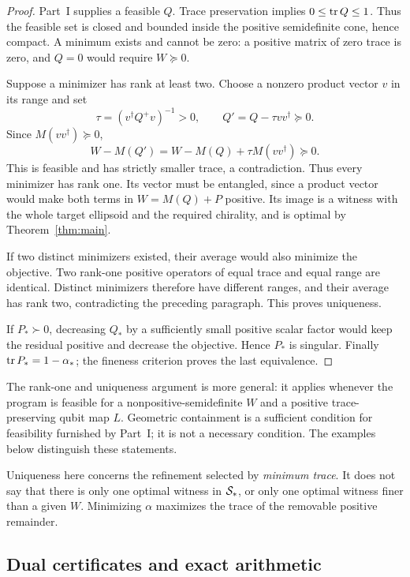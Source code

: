 \begin{proof}
Part~I supplies a feasible $Q$. Trace preservation implies $0\leq\operatorname{tr} Q\leq1$. Thus the feasible set is closed and bounded inside the positive semidefinite cone, hence compact. A minimum exists and cannot be zero: a positive matrix of zero trace is zero, and $Q=0$ would require $W\succeq0$.

Suppose a minimizer has rank at least two. Choose a nonzero product vector $v$ in its range and set
\[
 \tau=(v^\dagger Q^+v)^{-1}>0,\qquad Q'=Q-\tau vv^\dagger\succeq0.
\]
Since $M(vv^\dagger)\succeq0$,
\[
 W-M(Q')=W-M(Q)+\tau M(vv^\dagger)\succeq0.
\]
This is feasible and has strictly smaller trace, a contradiction. Thus every minimizer has rank one. Its vector must be entangled, since a product vector would make both terms in $W=M(Q)+P$ positive. Its image is a witness with the whole target ellipsoid and the required chirality, and is optimal by Theorem~\ref{thm:main}.

If two distinct minimizers existed, their average would also minimize the objective. Two rank-one positive operators of equal trace and equal range are identical. Distinct minimizers therefore have different ranges, and their average has rank two, contradicting the preceding paragraph. This proves uniqueness.

If $P_*\succ0$, decreasing $Q_*$ by a sufficiently small positive scalar factor would keep the residual positive and decrease the objective. Hence $P_*$ is singular. Finally $\operatorname{tr} P_*=1-\alpha_*$; the fineness criterion proves the last equivalence.
\end{proof}

The rank-one and uniqueness argument is more general: it applies whenever the program is feasible for a nonpositive-semidefinite $W$ and a positive trace-preserving qubit map $L$. Geometric containment is a sufficient condition for feasibility furnished by Part~I; it is not a necessary condition. The examples below distinguish these statements.

Uniqueness here concerns the refinement selected by \emph{minimum trace}. It does not say that there is only one optimal witness in $\mathcal S_*$, or only one optimal witness finer than a given $W$. Minimizing $\alpha$ maximizes the trace of the removable positive remainder.

\subsection{Dual certificates and exact arithmetic}

